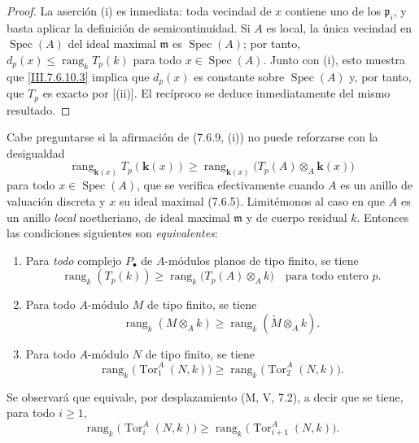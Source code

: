 \begin{proof}
La aserción \textnormal{(i)} es inmediata: toda vecindad de $x$
contiene uno de los $\mathfrak p_i$, y basta aplicar la definición de
semicontinuidad. Si $A$ es local, la única vecindad en $\operatorname{Spec}(A)$ del ideal
maximal $\mathfrak m$ es $\operatorname{Spec}(A)$; por tanto,
$d_p(x)\leq\operatorname{rang}_k T_p(k)$
para todo $x\in\operatorname{Spec}(A)$. Junto con \textnormal{(i)}, esto muestra que
\eqref{III.7.6.10.3} implica que $d_p(x)$ es constante sobre
$\operatorname{Spec}(A)$ y, por tanto, que $T_p$ es exacto por
[(ii)]. El recíproco se deduce inmediatamente del
mismo resultado.
\end{proof}

\begin{remark}[7.6.11]
Cabe preguntarse si la afirmación de (7.6.9, (i)) no puede reforzarse con
la desigualdad
\[
  \operatorname{rang}_{\mathbf{k}(x)}T_p(\boldsymbol{k}(x))
  \geq
  \operatorname{rang}_{\mathbf{k}(x)}
    \bigl(T_p(A)\otimes_A\boldsymbol{k}(x)\bigr)
  \tag{7.6.11.1}\label{III.7.6.11.1.fr}
\]
para todo $x\in\operatorname{Spec}(A)$, que se verifica efectivamente cuando $A$
es un anillo de valuación discreta y $x$ su ideal maximal (7.6.5).
Limitémonos al caso en que $A$ es un anillo \emph{local} noetheriano, de ideal maximal
$\mathfrak m$ y de cuerpo residual $k$. Entonces las condiciones siguientes son
\emph{equivalentes}:
\begin{enumerate}
  \item[\emph{a)}] Para \emph{todo} complejo $P_\bullet$ de $A$-módulos planos de tipo finito,
    se tiene
    \[
      \operatorname{rang}_k(T_p(k))
      \geq
      \operatorname{rang}_k\bigl(T_p(A)\otimes_A k\bigr)
      \quad\text{para todo entero }p.
      \tag{7.6.11.2}\label{III.7.6.11.2.fr}
    \]
  \item[\emph{b)}] Para todo $A$-módulo $M$ de tipo finito, se tiene
    \[
      \operatorname{rang}_k(M\otimes_A k)
      \geq
      \operatorname{rang}_k(\check M\otimes_A k).
      \tag{7.6.11.3}\label{III.7.6.11.3.fr}
    \]
  \item[\emph{c)}] Para todo $A$-módulo $N$ de tipo finito, se tiene
    \[
      \operatorname{rang}_k\bigl(\operatorname{Tor}_1^A(N,k)\bigr)
      \geq
      \operatorname{rang}_k\bigl(\operatorname{Tor}_2^A(N,k)\bigr).
      \tag{7.6.11.4}\label{III.7.6.11.4.fr}
    \]
\end{enumerate}

Se observará que equivale, por desplazamiento (M, V, 7.2), a decir que se tiene,
para todo $i\geq1$,
\[
  \operatorname{rang}_k\bigl(\operatorname{Tor}_i^A(N,k)\bigr)
  \geq
  \operatorname{rang}_k\bigl(\operatorname{Tor}_{i+1}^A(N,k)\bigr).
  \tag{7.6.11.5}\label{III.7.6.11.5.fr}
\]


\end{remark}
